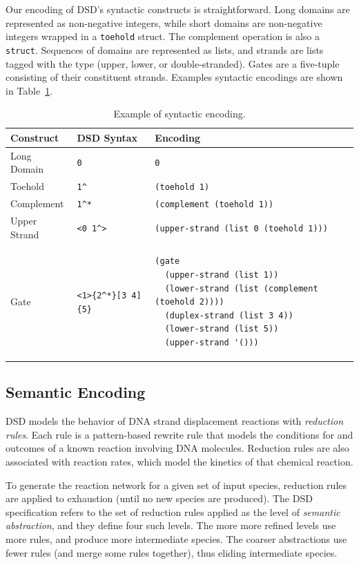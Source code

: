 \documentclass{article}
\begin{document}
Our encoding of DSD's syntactic constructs is straightforward.
Long domains are represented as non-negative integers, while
short domains are non-negative integers wrapped in a \verb;toehold; struct.
The complement operation is also a \verb;struct;.
Sequences of domains are represented as lists, and strands are lists
tagged with the type (upper, lower, or double-stranded). Gates
are a five-tuple consisting of their constituent strands.
Examples syntactic encodings are shown in Table~\ref{table:encoding-example}.

\begin{table}
\begin{tabular}{|l|l|l|} \hline
Construct     & DSD Syntax    & Encoding                      \\ \hline
Long Domain   & \verb;0;      & \verb;0;                      \\ \hline
Toehold       & \verb;1^;     & \verb;(toehold 1);            \\ \hline
Complement    & \verb;1^*;    & \verb;(complement (toehold 1)); \\ \hline
Upper Strand  & \verb;<0 1^>; & \verb;(upper-strand (list 0 (toehold 1))); \\
\hline
Gate          & \verb;<1>{2^*}[3 4]{5}; &
\begin{lstlisting}
(gate
  (upper-strand (list 1))
  (lower-strand (list (complement (toehold 2))))
  (duplex-strand (list 3 4))
  (lower-strand (list 5))
  (upper-strand '()))
\end{lstlisting}
\\
\hline
\end{tabular}
\caption{Example of syntactic encoding.}
\label{table:encoding-example}
\end{table}

\subsection{Semantic Encoding}
DSD models the behavior of DNA strand displacement reactions with
\emph{reduction rules}. Each rule is a pattern-based rewrite rule
that models the conditions for and outcomes of a known reaction
involving DNA molecules. Reduction rules are also associated with
reaction rates, which model the kinetics of that chemical reaction.

To generate the reaction network for a given set of input species,
reduction rules are applied to exhaustion (until no new species are produced).
The DSD specification refers to the set of reduction rules applied
as the level of \emph{semantic abstraction}, and they define four such levels.
The more more refined levels
use more rules, and produce more intermediate species. The 
coarser abstractions use fewer rules (and merge some rules together), thus
eliding intermediate species.
\end{document}
